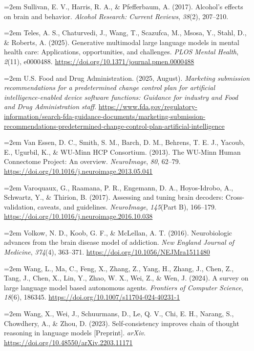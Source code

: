 \documentclass[11pt,a4paper,twoside]{article}
\begin{document}
\hangindent=2em Sullivan, E. V., Harris, R. A., \& Pfefferbaum, A. (2017). Alcohol's effects on brain and behavior. \textit{Alcohol Research: Current Reviews}, \textit{38}(2), 207--210.

\hangindent=2em Teles, A. S., Chaturvedi, J., Wang, T., Scazufca, M., Msosa, Y., Stahl, D., \& Roberts, A. (2025). Generative multimodal large language models in mental health care: Applications, opportunities, and challenges. \textit{PLOS Mental Health}, \textit{2}(11), e0000488. \url{https://doi.org/10.1371/journal.pmen.0000488}

\hangindent=2em U.S. Food and Drug Administration. (2025, August). \textit{Marketing submission recommendations for a predetermined change control plan for artificial intelligence-enabled device software functions: Guidance for industry and Food and Drug Administration staff}. \url{https://www.fda.gov/regulatory-information/search-fda-guidance-documents/marketing-submission-recommendations-predetermined-change-control-plan-artificial-intelligence}

\hangindent=2em Van Essen, D. C., Smith, S. M., Barch, D. M., Behrens, T. E. J., Yacoub, E., Ugurbil, K., \& WU-Minn HCP Consortium. (2013). The WU-Minn Human Connectome Project: An overview. \textit{NeuroImage}, \textit{80}, 62--79. \url{https://doi.org/10.1016/j.neuroimage.2013.05.041}

\hangindent=2em Varoquaux, G., Raamana, P. R., Engemann, D. A., Hoyos-Idrobo, A., Schwartz, Y., \& Thirion, B. (2017). Assessing and tuning brain decoders: Cross-validation, caveats, and guidelines. \textit{NeuroImage}, \textit{145}(Part B), 166--179. \url{https://doi.org/10.1016/j.neuroimage.2016.10.038}

\hangindent=2em Volkow, N. D., Koob, G. F., \& McLellan, A. T. (2016). Neurobiologic advances from the brain disease model of addiction. \textit{New England Journal of Medicine}, \textit{374}(4), 363--371. \url{https://doi.org/10.1056/NEJMra1511480}

\hangindent=2em Wang, L., Ma, C., Feng, X., Zhang, Z., Yang, H., Zhang, J., Chen, Z., Tang, J., Chen, X., Lin, Y., Zhao, W. X., Wei, Z., \& Wen, J. (2024). A survey on large language model based autonomous agents. \textit{Frontiers of Computer Science}, \textit{18}(6), 186345. \url{https://doi.org/10.1007/s11704-024-40231-1}

\hangindent=2em Wang, X., Wei, J., Schuurmans, D., Le, Q. V., Chi, E. H., Narang, S., Chowdhery, A., \& Zhou, D. (2023). Self-consistency improves chain of thought reasoning in language models [Preprint]. \textit{arXiv}. \url{https://doi.org/10.48550/arXiv.2203.11171}
\end{document}
